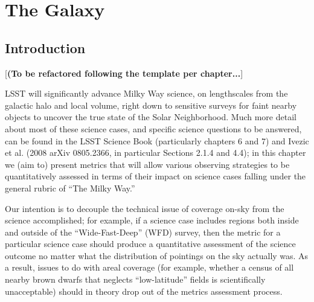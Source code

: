 \chapter[The Galaxy]{The Galaxy}
\def\chpname{galaxy}\label{chp:\chpname}



\section{Introduction}
\def\secname{intro}\label{sec:\secname}


[{\bf (To be refactored following the template per chapter...}]

LSST will significantly advance Milky Way science, on lengthscales
from the galactic halo and local volume, right down to sensitive
surveys for faint nearby objects to uncover the true state of the
Solar Neighborhood.
Much more detail about most of these science cases, and specific
science questions to be answered, can be found in the LSST Science
Book (particularly chapters 6 and 7) and Ivezic et al. (2008 arXiv
0805.2366, in particular Sections 2.1.4 and 4.4); in this chapter we
(aim to) present metrics that will allow various observing strategies
to be quantitatively assessed in terms of their impact on science
cases falling under the general rubric of ``The Milky Way.''  

Our intention is to decouple the technical issue of coverage on-sky
from the science accomplished; for example, if a science case includes
regions both inside and outside of the ``Wide-Fast-Deep'' (WFD)
survey, then the metric for a particular science case should produce a
quantitative assessment of the science outcome no matter what the
distribution of pointings on the sky actually was. As a result, issues
to do with areal coverage (for example, whether a census of all nearby
brown dwarfs that neglects ``low-latitude'' fields is scientifically
unacceptable) should in theory drop out of the metrics assessment
process.

